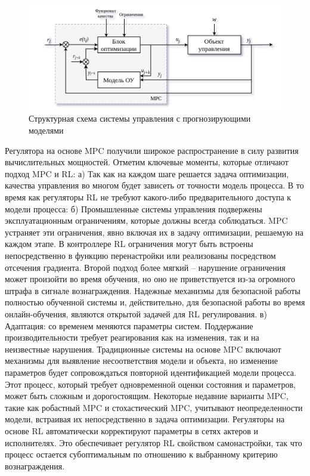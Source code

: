\begin{figure}[ht!] 
	\centering
	\includegraphics[width=0.9\linewidth]{my_folder/figure/schema/MPC.png}
	\caption{Структурная схема системы управления с прогнозирующими моделями}
	\label{fig:mpc-ch2}
\end{figure}


Регулятора на основе MPC получили широкое распространение в силу развития вычислительных мощностей. Отметим ключевые моменты, которые отличают подход MPC и RL: а) Так как на каждом шаге решается задача оптимизации, качества управления во многом будет зависеть от точности модель процесса. В то время как регуляторы RL не требуют какого-либо предварительного доступа к модели процесса: б) Промышленные системы управления подвержены эксплуатационным ограничениям, которые должны всегда соблюдаться. MPC устраняет эти ограничения, явно включая их в задачу оптимизации, решаемую на каждом этапе. В контроллере RL ограничения могут быть встроены непосредственно в функцию перенастройки или реализованы посредством отсечения градиента. Второй подход более мягкий -- нарушение ограничения может произойти во время обучения, но оно не приветствуется из-за огромного штрафа в сигнале вознаграждения. Надежные механизмы для безопасной работы полностью обученной системы и, действительно, для безопасной работы во время онлайн-обучения, являются открытой задачей для RL регулирования.
в) Адаптация: со временем меняются параметры систем. Поддержание производительности требует реагирования как на изменения, так и на неизвестные нарушения. Традиционные системы на основе MPC включают механизмы для
выявление несоответствия модели и объекта, но изменение параметров будет сопровождаться повторной идентификацией модели процесса. Этот процесс, который требует одновременной оценки состояния и параметров, может быть сложным и дорогостоящим. Некоторые недавние варианты MPC, такие как робастный MPC и стохастический MPC, учитывают неопределенности модели, встраивая их непосредственно в задача оптимизации. Регуляторы на основе RL автоматически корректируют параметры в сетях актеров и исполнителях. Это обеспечивает регулятор RL свойством самонастройки, так что процесс остается субоптимальным по отношению к выбранному критерию вознаграждения.



